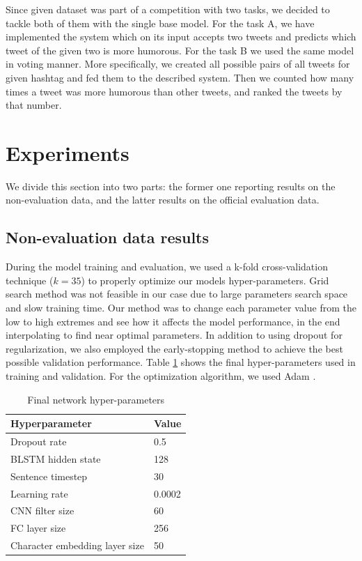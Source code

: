 \documentclass[10pt, a4paper]{article}
\begin{document}
Since given dataset was part of a competition with two tasks, we decided to tackle both of them with the single base model.
For the task A, we have implemented the system which on its input accepts two tweets and predicts which tweet of the given two is more humorous. For the task B we used the same model in voting manner. More specifically, we created all possible pairs of all tweets for given hashtag and fed them to the described system. Then we counted how many times a tweet was more humorous than other tweets, and ranked the tweets by that number.

\section{Experiments}
We divide this section into two parts: the former one reporting results on the non-evaluation data, and the latter results on the official evaluation data.

\subsection{Non-evaluation data results}
During the model training and evaluation, we used a k-fold cross-validation technique ($k=35$) to properly optimize our models hyper-parameters. Grid search method was not feasible in our case due to large parameters search space and slow training time. Our method was to change each parameter value from the low to high extremes and see how it affects the model performance, in the end interpolating to find near optimal parameters. In addition to using dropout for regularization, we also employed the early-stopping \citep{caruana2000overfitting} method to achieve the best possible validation performance. Table \ref{tab:hyperparams} shows the final hyper-parameters used in training and validation. For the optimization algorithm, we used Adam \citep{adam2014}.

\begin{table}
\small
\caption{Final network hyper-parameters}
 \label{tab:hyperparams}
 \begin{center}
 \begin{tabular}{ll}
 \toprule
     Hyperparameter & Value\\
 \midrule
     Dropout rate & 0.5\\
     BLSTM hidden state & 128\\
     Sentence timestep & 30\\
     Learning rate & 0.0002\\
     CNN filter size & 60 \\
     FC layer size & 256\\
     Character embedding layer size & 50\\
 \bottomrule
 \end{tabular}
 \end{center}
\end{table}
\end{document}
